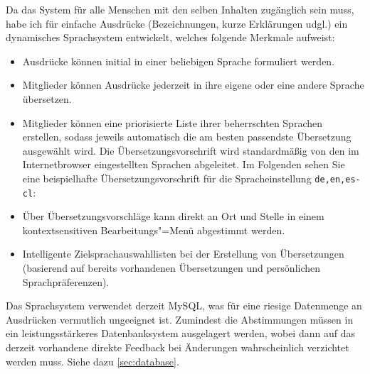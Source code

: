 Da das System für alle Menschen mit den selben Inhalten zugänglich sein muss, habe ich für einfache Ausdrücke (Bezeichnungen, kurze Erklärungen udgl.) ein dynamisches Sprachsystem entwickelt, welches folgende Merkmale aufweist:
\begin{itemize}
\item Ausdrücke können initial in einer beliebigen Sprache formuliert werden.
\item Mitglieder können Ausdrücke jederzeit in ihre eigene oder eine andere Sprache übersetzen.
\item Mitglieder können eine priorisierte Liste ihrer beherrschten Sprachen erstellen, sodass jeweils automatisch die am besten passendste Übersetzung ausgewählt wird. Die Übersetzungsvorschrift wird standardmäßig von den im Internetbrowser eingestellten Sprachen abgeleitet. Im Folgenden sehen Sie eine beispielhafte Übersetzungsvorschrift für die Spracheinstellung \verb|de,en,es-cl|:
\item Über Übersetzungsvorschläge kann direkt an Ort und Stelle in einem kontextsensitiven Bearbeitungs"=Menü abgestimmt werden.
\item Intelligente Zielsprachauswahllisten bei der Erstellung von Übersetzungen (basierend auf bereits vorhandenen Übersetzungen und persönlichen Sprachpräferenzen).
\end{itemize}

Das Sprachsystem verwendet derzeit MySQL, was für eine riesige Datenmenge an Ausdrücken vermutlich ungeeignet ist. Zumindest die Abstimmungen müssen in ein leistungsstärkeres Datenbanksystem ausgelagert werden, wobei dann auf das derzeit vorhandene direkte Feedback bei Änderungen wahrscheinlich verzichtet werden muss. Siehe dazu \vref{sec:database}.

